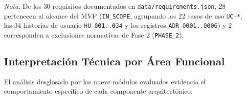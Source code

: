 \documentclass[stu,12pt,a4paper]{apa7}
\begin{document}
\endgroup\medskip

\begingroup\singlespacing\small\noindent\emph{Nota.} De los 30 requisitos documentados en \texttt{data/\allowbreak{}requirements.\allowbreak{}json}, 28 pertenecen al alcance del MVP (\texttt{IN\_\allowbreak{}SCOPE}, agrupando los 22 casos de uso \texttt{UC-{}\allowbreak{}*}, las 34 historias de usuario \texttt{HU-{}\allowbreak{}001.\allowbreak{}.\allowbreak{}034} y los registros \texttt{ADR-{}\allowbreak{}0001.\allowbreak{}.\allowbreak{}0006}) y 2 corresponden a exclusiones normativas de Fase 2 (\texttt{PHASE\_\allowbreak{}2}).\par\endgroup\medskip

\subsection{Interpretación Técnica por Área Funcional}\label{interpretaciuxf3n-tuxe9cnica-por-uxe1rea-funcional}

El análisis desglosado por los nueve módulos evaluados evidencia el comportamiento específico de cada componente arquitectónico:
\end{document}
